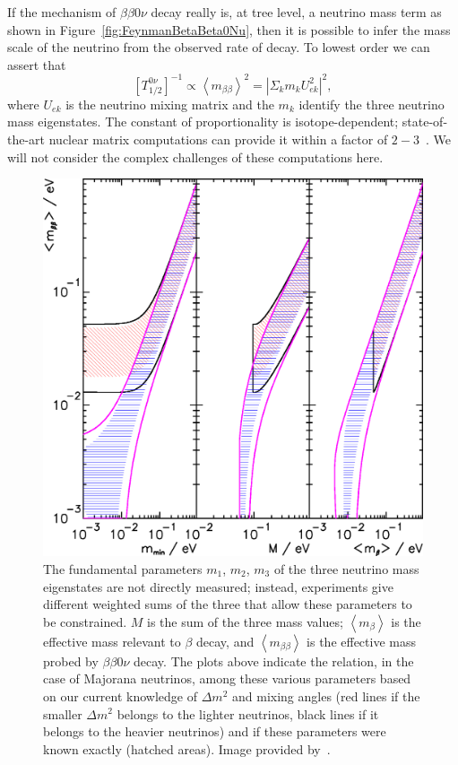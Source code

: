 If the mechanism of $\beta\beta 0\nu$ decay really is, at tree level, a neutrino mass term as shown in Figure~\ref{fig:FeynmanBetaBeta0Nu}, then it is possible to infer the mass scale of the neutrino from the observed rate of decay.  To lowest order we can assert that
\[
[T^{0\nu}_{1/2}]^{-1} \propto \left< m_{\beta\beta} \right>^2 = \left|\Sigma_k m_k U_{ek}^2\right|^2,
\]
where $U_{ek}$ is the neutrino mixing matrix and the $m_k$ identify the three neutrino mass eigenstates.  The constant of proportionality is isotope-dependent; state-of-the-art nuclear matrix computations can provide it within a factor of $2-3$~\cite{RMPbb0n}.  We will not consider the complex challenges of these computations here.

\begin{figure}
\includegraphics[scale=0.45]{PDGNeutrinoMassBounds.eps}
\caption{The fundamental parameters $m_1$, $m_2$, $m_3$ of the three neutrino mass eigenstates are not directly measured; instead, experiments give different weighted sums of the three that allow these parameters to be constrained.  $M$ is the sum of the three mass values; $\left<m_\beta\right>$ is the effective mass relevant to $\beta$ decay, and $\left<m_{\beta\beta}\right>$ is the effective mass probed by $\beta\beta 0\nu$ decay.  The plots above indicate the relation, in the case of Majorana neutrinos, among these various parameters based on our current knowledge of $\Delta m^2$ and mixing angles (red lines if the smaller $\Delta m^2$ belongs to the lighter neutrinos, black lines if it belongs to the heavier neutrinos) and if these parameters were known exactly (hatched areas).  Image provided by~\cite{PDG}.}
\label{fig:NeutrinoMassBounds}
\end{figure}

